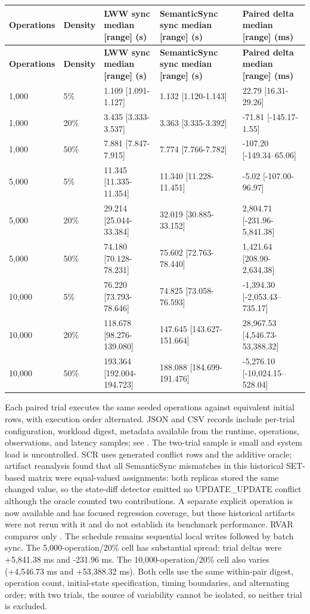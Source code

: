\documentclass[runningheads]{llncs}
\begin{document}
\begin{longtable}{p{}p{}p{}p{}p{}}
\textbf{Operations} & \textbf{Density} & \textbf{LWW sync median [range] (s)} & \textbf{SemanticSync sync median [range] (s)} & \textbf{Paired delta median [range] (ms)} \\\hline
\endfirsthead\hline \textbf{Operations} & \textbf{Density} & \textbf{LWW sync median [range] (s)} & \textbf{SemanticSync sync median [range] (s)} & \textbf{Paired delta median [range] (ms)} \\\hline\endhead
1,000 & 5\% & 1.109 [1.091-1.127] & 1.132 [1.120-1.143] & 22.79 [16.31-29.26] \\
1,000 & 20\% & 3.435 [3.333-3.537] & 3.363 [3.335-3.392] & -71.81 [-145.17-1.55] \\
1,000 & 50\% & 7.881 [7.847-7.915] & 7.774 [7.766-7.782] & -107.20 [-149.34--65.06] \\
5,000 & 5\% & 11.345 [11.335-11.354] & 11.340 [11.228-11.451] & -5.02 [-107.00-96.97] \\
5,000 & 20\% & 29.214 [25.044-33.384] & 32.019 [30.885-33.152] & 2,804.71 [-231.96-5,841.38] \\
5,000 & 50\% & 74.180 [70.128-78.231] & 75.602 [72.763-78.440] & 1,421.64 [208.90-2,634.38] \\
10,000 & 5\% & 76.220 [73.793-78.646] & 74.825 [73.058-76.593] & -1,394.30 [-2,053.43--735.17] \\
10,000 & 20\% & 118.678 [98.276-139.080] & 147.645 [143.627-151.664] & 28,967.53 [4,546.73-53,388.32] \\
10,000 & 50\% & 193.364 [192.004-194.723] & 188.088 [184.699-191.476] & -5,276.10 [-10,024.15--528.04] \\
\end{longtable}
Each paired trial executes the same seeded operations against equivalent initial rows, with execution order alternated. JSON and CSV records include per-trial configuration, workload digest, metadata available from the runtime, operations, observations, and latency samples; see \texttt{}. The two-trial sample is small and system load is uncontrolled. SCR uses generated conflict rows and the additive oracle; artifact reanalysis found that all SemanticSync mismatches in this historical SET-based matrix were equal-valued assignments: both replicas stored the same changed value, so the state-diff detector emitted no UPDATE\_UPDATE conflict although the oracle counted two contributions. A separate explicit \texttt{} operation is now available and has focused regression coverage, but these historical artifacts were not rerun with it and do not establish its benchmark performance. RVAR compares only \texttt{}. The schedule remains sequential local writes followed by batch sync. The 5,000-operation/20\% cell has substantial spread: trial deltas were +5,841.38 ms and -231.96 ms. The 10,000-operation/20\% cell also varies (+4,546.73 ms and +53,388.32 ms). Both cells use the same within-pair digest, operation count, initial-state specification, timing boundaries, and alternating order; with two trials, the source of variability cannot be isolated, so neither trial is excluded.
\end{document}

